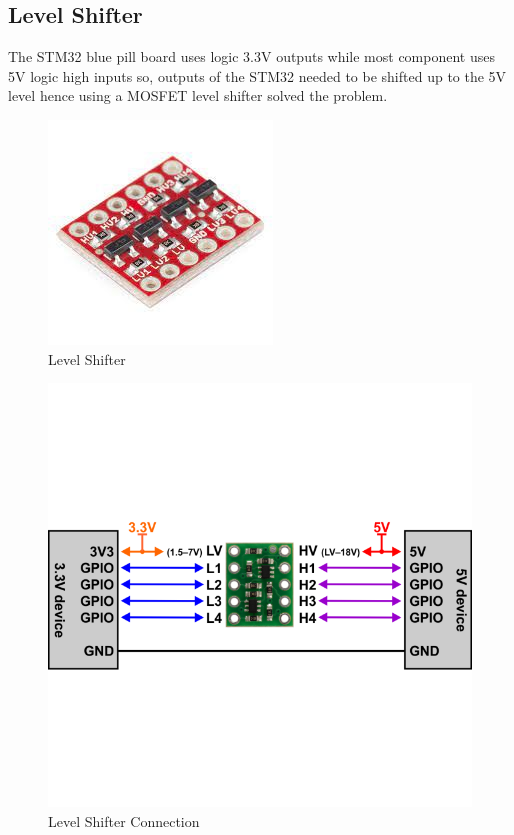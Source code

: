 \subsection{Level Shifter}
The STM32 blue pill board uses logic 3.3V outputs while most component uses 5V logic high inputs so,
outputs of the STM32 needed to be shifted up to the 5V level hence using a MOSFET
level shifter solved the problem.

\begin{figure}[h]
    \centering
    \includegraphics[scale=.5]{figures/9-5.jpeg}
    \caption{Level Shifter}
\end{figure}
\clearpage

\begin{figure}[h]
    \centering
    \includegraphics[scale=.5]{figures/9-6.png}
    \caption{Level Shifter Connection}
\end{figure}



